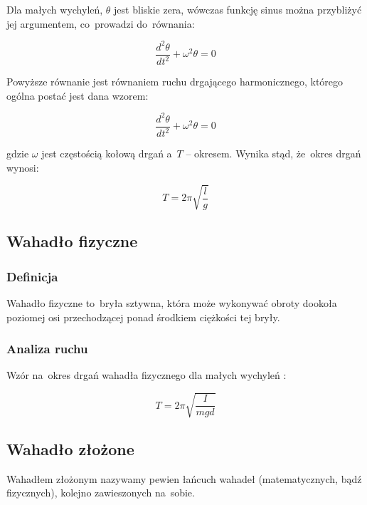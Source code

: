 \documentclass{classrep}
\begin{document}
Dla małych wychyleń, $ \theta $ jest bliskie zera, wówczas funkcję sinus można
przybliżyć jej argumentem, co~prowadzi do~równania:

\begin{equation}
  \frac{d^{2}\theta }{dt^{2}}+\omega ^{2}\theta = 0
\end{equation}

Powyższe równanie jest równaniem ruchu drgającego harmonicznego, którego ogólna
postać jest dana wzorem:

\begin{equation}
  \frac{d^{2}\theta }{dt^{2}}+\omega ^{2}\theta = 0
\end{equation}

gdzie $ \omega $ jest częstością kołową drgań a~$ T $ -- okresem. Wynika stąd,
że~okres drgań wynosi:

\begin{equation}
  T = 2\pi \sqrt{\frac{l}{g}}
\end{equation}

\subsection{Wahadło fizyczne}

\subsubsection{Definicja}

Wahadło fizyczne \cite{skorko} to~bryła sztywna, która może wykonywać obroty
dookoła poziomej osi przechodzącej ponad środkiem ciężkości tej bryły.

\subsubsection{Analiza ruchu}

Wzór na~okres drgań wahadła fizycznego dla małych wychyleń \cite{tablice}:

\begin{equation}
  T = 2\pi \sqrt{\frac{I}{mgd}}
\end{equation}

\subsection{Wahadło złożone}

Wahadłem złożonym nazywamy pewien łańcuch wahadeł (matematycznych, bądź
fizycznych), kolejno zawieszonych na~sobie.
\end{document}

